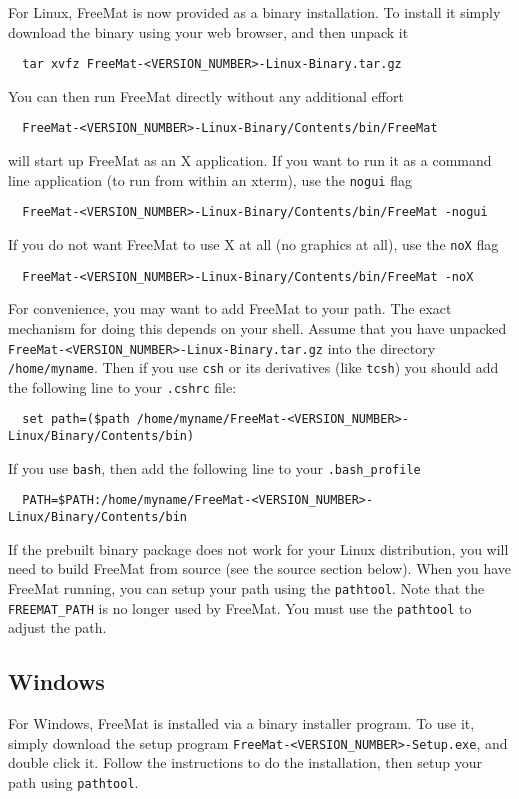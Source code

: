 For Linux, FreeMat is now provided as a binary installation.  To install it
simply download the binary using your web browser, and then unpack it
\begin{verbatim}
  tar xvfz FreeMat-<VERSION_NUMBER>-Linux-Binary.tar.gz
\end{verbatim}
You can then run FreeMat directly without any additional effort
\begin{verbatim}
  FreeMat-<VERSION_NUMBER>-Linux-Binary/Contents/bin/FreeMat
\end{verbatim}
will start up FreeMat as an X application.  If you want to run it
as a command line application (to run from within an xterm), use
the \verb|nogui| flag
\begin{verbatim}
  FreeMat-<VERSION_NUMBER>-Linux-Binary/Contents/bin/FreeMat -nogui
\end{verbatim}
If you do not want FreeMat to use X at all (no graphics at all), use
the \verb|noX| flag
\begin{verbatim}
  FreeMat-<VERSION_NUMBER>-Linux-Binary/Contents/bin/FreeMat -noX
\end{verbatim}
For convenience, you may want to add FreeMat to your path.  The exact
mechanism for doing this depends on your shell.  Assume that you have
unpacked \verb|FreeMat-<VERSION_NUMBER>-Linux-Binary.tar.gz| into the directory
\verb|/home/myname|.  Then if you use \verb|csh| or its derivatives (like \verb|tcsh|)
you should add the following line to your \verb|.cshrc| file:
\begin{verbatim}
  set path=($path /home/myname/FreeMat-<VERSION_NUMBER>-Linux/Binary/Contents/bin)
\end{verbatim}
If you use \verb|bash|, then add the following line to your \verb|.bash_profile|
\begin{verbatim}
  PATH=$PATH:/home/myname/FreeMat-<VERSION_NUMBER>-Linux/Binary/Contents/bin
\end{verbatim}
If the prebuilt binary package does not work for your Linux distribution, you
will need to build FreeMat from source (see the source section below).  When
you have FreeMat running, you can setup your path using the \verb|pathtool|.  Note
that the \verb|FREEMAT_PATH| is no longer used by FreeMat.  You must use the \verb|pathtool|
to adjust the path.
\subsection{Windows}

For Windows, FreeMat is installed via a binary installer program.  To use it,
simply download the setup program \verb|FreeMat-<VERSION_NUMBER>-Setup.exe|, and double
click it.  Follow the instructions to do the installation, then setup your path
using \verb|pathtool|.
